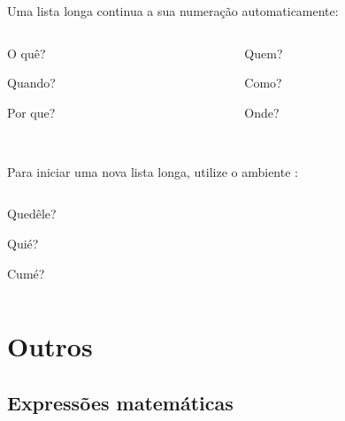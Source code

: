 \documentclass[aspectratio=169]{beamer}
\begin{document}
\begin{frame}[t]\frametitle{\secname}\framesubtitle{\subsecname}
  Uma lista longa continua a sua numeração automaticamente:
  \begin{columns}[T]
    \begin{column}{.5\textwidth}
      \begin{listalonga*}
        \item O quê?
        \item Quando?
        \item Por que?
      \end{listalonga*}
    \end{column}
    \begin{column}{.5\textwidth}
      \begin{listalonga}
        \item Quem?
        \item Como?
        \item Onde?
      \end{listalonga}
    \end{column}
  \end{columns}
  ~\\

  Para iniciar uma nova lista longa, utilize o ambiente :
  \begin{columns}[T]
    \begin{column}{.5\textwidth}
      \begin{listalonga*}
        \item Quedêle?
        \item Quié?
        \item Cumé?
      \end{listalonga*}
    \end{column}
    \begin{column}{.5\textwidth}
      ~
    \end{column}
  \end{columns}
\end{frame}

\section{Outros}

\subsection{Expressões matemáticas}
\end{document}
